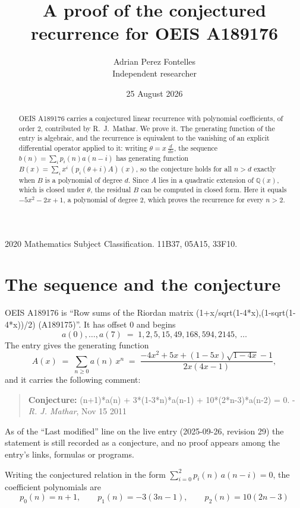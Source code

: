 \documentclass[11pt,a4paper]{article}
\title{A proof of the conjectured recurrence for OEIS A189176}
\author{Adrian Perez Fontelles\\ \small Independent researcher}
\date{25 August 2026}
\theoremstyle{plain}
\theoremstyle{definition}
\begin{document}
\maketitle

\begin{abstract}
OEIS A189176 carries a conjectured linear recurrence with polynomial coefficients, of
order 2, contributed by R.~J.~Mathar. We prove it. The generating function of the
entry is algebraic, and the recurrence is equivalent to the vanishing of an explicit
differential operator applied to it: writing $\theta=x\,\frac{d}{dx}$, the sequence
$b(n)=\sum_{i}p_{i}(n)a(n-i)$ has generating function
$B(x)=\sum_{i}x^{i}\,(p_{i}(\theta+i)A)(x)$, so the conjecture holds for all $n>d$ exactly
when $B$ is a polynomial of degree $d$. Since $A$ lies in a quadratic extension of
$\mathbb{Q}(x)$, which is closed under $\theta$, the residual $B$ can be computed in
closed form. Here it equals $- 5 x^{2} - 2 x + 1$, a polynomial of degree $2$, which proves
the recurrence for every $n>2$.
\end{abstract}

\noindent\small 2020 Mathematics Subject Classification. 11B37, 05A15, 33F10.\normalsize

\section{The sequence and the conjecture}

OEIS A189176 is ``Row sums of the Riordan matrix (1+x/sqrt(1-4*x),(1-sqrt(1-4*x))/2) (A189175)''. It has offset $0$ and begins
\[
a(0),\dots,a(7)\;=\;1, 2, 5, 15, 49, 168, 594, 2145,\ \dots
\]
The entry gives the generating function
\begin{equation}\label{eq:gf}
A(x)\;=\;\sum_{n\ge 0} a(n)\,x^{n}\;=\;\frac{- 4 x^{2} + 5 x + \left(1 - 5 x\right) \sqrt{1 - 4 x} - 1}{2 x \left(4 x - 1\right)} ,
\end{equation}
and it carries the following comment:
\begin{quote}\small
\textbf{Conjecture:} (n+1)*a(n) + 3*(1-3*n)*a(n-1) + 10*(2*n-3)*a(n-2) = 0. - \emph{R. J. Mathar}, Nov 15 2011
\end{quote}
As of the ``Last modified'' line on the live entry (2025-09-26, revision 29) the
statement is still recorded as a conjecture, and no proof appears among the entry's links,
formulas or programs.

Writing the conjectured relation in the form $\sum_{i=0}^{2}p_{i}(n)\,a(n-i)=0$,
the coefficient polynomials are
\[
p_{0}(n)=n + 1,\qquad p_{1}(n)=- 3 \left(3 n - 1\right),\qquad p_{2}(n)=10 \left(2 n - 3\right)
\]
\end{document}
